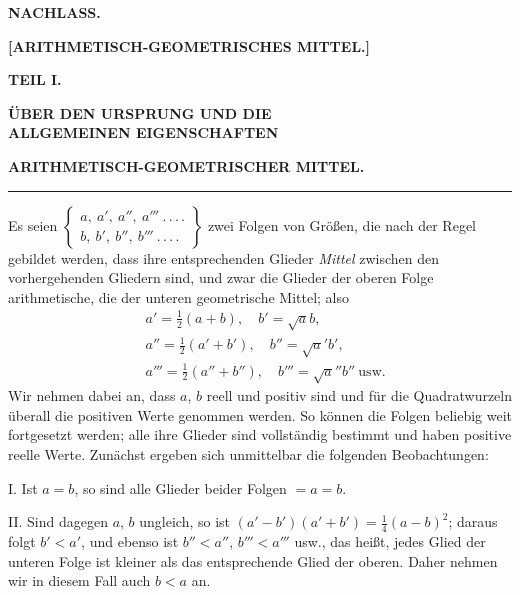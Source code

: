 \begingroup
\renewcommand{\arraystretch}{1.45}
\clearpage{}
\begin{center}
\textbf{NACHLASS.}\par
\textbf{[ARITHMETISCH-GEOMETRISCHES MITTEL.]}\par
\textbf{TEIL I.}\par
\textbf{ÜBER DEN URSPRUNG UND DIE}\\\textbf{ALLGEMEINEN EIGENSCHAFTEN}\par
\textbf{ARITHMETISCH-GEOMETRISCHER MITTEL.}\par
\rule{0.09\linewidth}{0.4pt}\par
\end{center}
Es seien $\left\{\begin{array}{l}a,\allowbreak \ a',\allowbreak \ a'',\allowbreak \ a'''\ .\,\allowbreak .\,\allowbreak .\,\allowbreak .\\ b,\allowbreak \ b',\allowbreak \ b'',\allowbreak \ b'''\ .\,\allowbreak .\,\allowbreak .\,\allowbreak .\end{array}\right\}$ zwei Folgen von Größen, die nach der Regel gebildet werden, dass
ihre entsprechenden Glieder \textit{Mittel} zwischen den vorhergehenden Gliedern sind,
und zwar die Glieder der oberen Folge arithmetische, die der unteren geometrische Mittel; also
\[
\begin{aligned}&a'=\tfrac12(a+b),\quad b'=\surd ab,\\[6pt]&a''=\tfrac12(a'+b'),\quad b''=\surd a'b',\\[6pt]&a'''=\tfrac12(a''+b''),\quad b'''=\surd a''b''\ \mathrm{usw.}\end{aligned}
\]
Wir nehmen dabei an, dass $a$, $b$ reell und positiv sind und für die Quadratwurzeln
überall die positiven Werte genommen werden. So können die Folgen beliebig weit fortgesetzt
werden; alle ihre Glieder sind vollständig bestimmt und haben positive reelle Werte. Zunächst ergeben sich unmittelbar die folgenden Beobachtungen:
\par
I. Ist $a=b$, so sind alle Glieder beider Folgen $=a=b$.
\par
II. Sind dagegen $a$, $b$ ungleich, so ist $(a'-b')(a'+b')=\tfrac14(a-b)^2$; daraus
folgt $b'<a'$, und ebenso ist $b''<a''$, $b'''<a'''$ usw., das heißt, jedes Glied der unteren Folge ist kleiner als das entsprechende Glied der oberen. Daher
nehmen wir in diesem Fall auch $b<a$ an.

